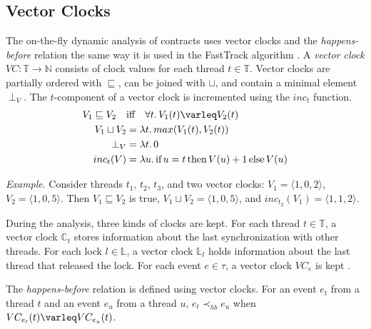 \subsection{Vector Clocks}

The on-the-fly dynamic analysis of contracts uses vector clocks and the
\emph{happens-before} relation the same way it is used in the FastTrack
algorithm \cite{fasttrack}. A \emph{vector clock} $VC: \mathbb{T} \rightarrow
\mathbb{N}$ consists of clock values for each thread $t \in \mathbb{T}$. Vector
clocks are partially ordered with $\sqsubseteq$, can be joined with $\sqcup$,
and contain a minimal element $\perp_V$. The $t$-component of a vector clock is
incremented using the $inc_t$ function.
\begin{align*}
    V_1 \sqsubseteq V_2 \quad &\text{iff} \quad \forall t. \, V_1(t) \varleq
    V_2(t) \\
    V_1 \sqcup V_2 &= \lambda t. \, max(V_1(t), V_2(t)) \\
    \perp_V &= \lambda t. \, 0 \\
    inc_t(V) &= \lambda u. \, \text{if} \, u=t \, \text{then} \, V(u)+1 \,
    \text{else} \, V(u)
\end{align*}

\emph{Example}. Consider threads $t_1$, $t_2$, $t_3$, and two vector clocks:
$V_1 = \langle 1,0,2 \rangle$, $V_2 = \langle 1,0,5 \rangle$. Then $V_1
\sqsubseteq V_2$ is true, $V_1 \sqcup V_2 = \langle 1,0,5 \rangle$, and
$inc_{t_2}(V_1) = \langle 1,1,2 \rangle$.

During the analysis, three kinds of clocks are kept. For each thread $t \in
\mathbb{T}$, a vector clock $\mathbb{C}_t$ stores information about the last
synchronization with other threads. For each lock $l \in \mathbb{L}$, a vector
clock $\mathbb{L}_l$ holds information about the last thread that released the
lock. For each event $e \in \tau$, a vector clock $VC_e$ is kept
\cite{contracts}.

The \emph{happens-before} relation is defined using vector clocks. For an event
$e_t$ from a thread $t$ and an event $e_u$ from a thread $u$, $e_t \prec_{hb}
e_u$ when $VC_{e_t}(t) \varleq VC_{e_u}(t)$.

